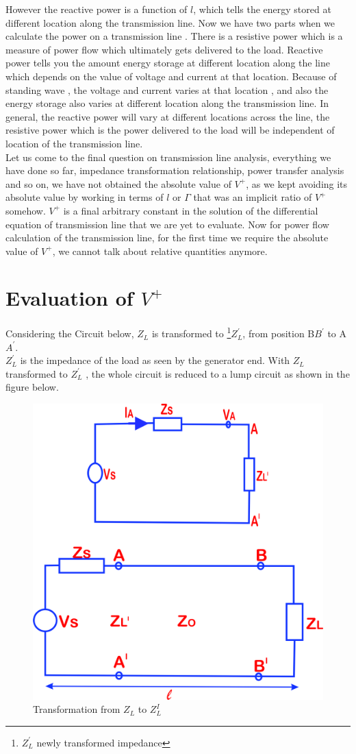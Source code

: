 However the reactive power is a function of $l$, which tells the energy stored at different location along the transmission line. Now we have two parts when we calculate the power on a transmission line . There is a resistive power which is a measure of power flow which ultimately gets delivered to the load. Reactive power tells you the amount energy storage at different location along the line which depends on the value of voltage and current at that location. Because of standing wave , the voltage and current varies at that location , and also the energy storage also varies at different location along the transmission line. In general, the reactive power will vary at different locations across the line, the resistive power which is the power delivered to the load will be independent of location of the transmission line.\\
Let us come to the final question on transmission line analysis, everything we have done so far, impedance transformation relationship, power transfer analysis and so on, we have not obtained the absolute value of $V^+$, as we kept avoiding its absolute value by working in terms of $l$ or $\Gamma$ that was an implicit ratio of $V^+$ somehow. $V^+$ is a final arbitrary constant in the solution of the differential equation of transmission line that we are yet to evaluate. Now for power flow calculation of the transmission line, for the first time we require the absolute value of $V^+$, we cannot talk about relative quantities anymore.

\section{Evaluation of \textbf{$ V ^ {+} $} } 
Considering the Circuit below, $Z_L$ is transformed to \footnote{$Z^{'}_L$ newly transformed impedance}$Z^{'}_L$, from position B$B^{'}$ to A$A^{'}$.\\
$Z^{'}_L$ is the impedance of the load as seen by the generator end. With $Z_L$ transformed to $Z^{'}_L$ , the whole circuit is reduced to a lump circuit as shown in the figure below.
\begin{figure}[h]
\centering
\includegraphics[width=0.5\linewidth]{./graphics/qwerrtt}
\caption{Transformation from $Z_L$ to $Z_{L}^I$}
\label{fig:qwerrtt}
\end{figure}

